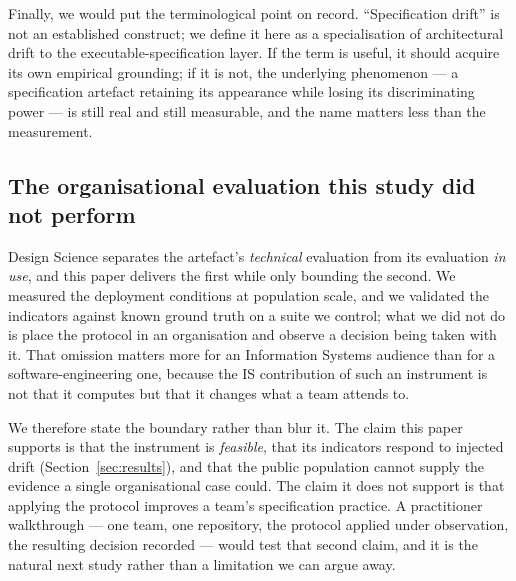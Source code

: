 Finally, we would put the terminological point on record. ``Specification drift'' is not an
established construct; we define it here as a specialisation of architectural drift
\citep{PerryWolf1992,Rosik2010ArchDrift} to the executable-specification layer. If the term is useful,
it should acquire its own empirical grounding; if it is not, the underlying phenomenon --- a
specification artefact retaining its appearance while losing its discriminating power --- is still
real and still measurable, and the name matters less than the measurement.

\subsection{The organisational evaluation this study did not perform}

Design Science separates the artefact's \emph{technical} evaluation from its evaluation
\emph{in use}, and this paper delivers the first while only bounding the second. We measured the
deployment conditions at population scale, and we validated the indicators against known ground truth
on a suite we control; what we did not do is place the protocol in an organisation and observe a
decision being taken with it. That omission matters more for an Information Systems audience than for a
software-engineering one, because the IS contribution of such an instrument is not that it computes but
that it changes what a team attends to.

We therefore state the boundary rather than blur it. The claim this paper supports is that the
instrument is \emph{feasible}, that its indicators respond to injected drift (Section~\ref{sec:results}),
and that the public population cannot supply the evidence a single organisational case could. The claim
it does not support is that applying the protocol improves a team's specification practice. A
practitioner walkthrough --- one team, one repository, the protocol applied under observation, the
resulting decision recorded --- would test that second claim, and it is the natural next study rather
than a limitation we can argue away.
